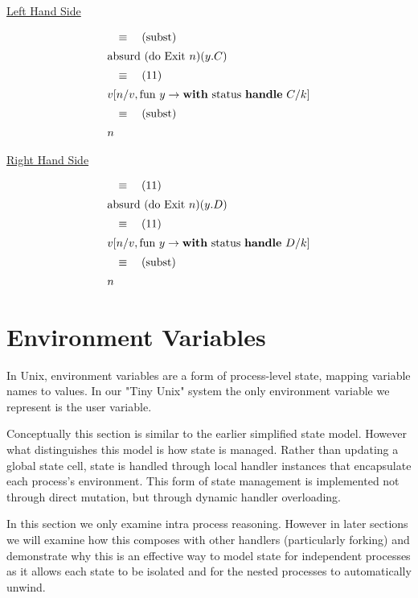 \documentclass[logo,bsc,singlespacing,parskip]{infthesis}
\begin{document}
\underline{Left Hand Side}

\[
\begin{array}{l}
\quad\equiv\quad (\text{subst}) \\[5pt]
\text{absurd (do Exit } n) (y. C) \\[5pt]
\quad\equiv\quad (11) \\[5pt]
v [n/v, \text{fun } y \rightarrow \text{\textbf{with} status \textbf{handle} } C/k] \\[5pt]
\quad\equiv\quad (\text{subst}) \\[5pt]
n
\end{array}
\]

\underline{Right Hand Side}

\[
\begin{array}{l}
\quad\equiv\quad (11) \\[5pt]
\text{absurd (do Exit } n) (y. D) \\[5pt]
\quad\equiv\quad (11) \\[5pt]
v [n/v, \text{fun } y \rightarrow \text{\textbf{with} status \textbf{handle} } D/k] \\[5pt]
\quad\equiv\quad (\text{subst}) \\[5pt]
n
\end{array}
\]





\section{Environment Variables}
In Unix, environment variables are a form of process-level state, mapping variable names to values. In our "Tiny Unix" system the only environment variable we represent is the user variable. 

Conceptually this section is similar to the earlier simplified state model. However what distinguishes this model is how state is managed. Rather than updating a global state cell, state is handled through local handler instances that encapsulate each process’s environment. This form of state management is implemented not through direct mutation, but through dynamic handler overloading. 

In this section we only examine intra process reasoning. However in later sections we will examine how this composes with other handlers (particularly forking) and demonstrate why this is an effective way to model state for independent processes as it allows each state to be isolated and for the nested processes to automatically unwind.
\end{document}
